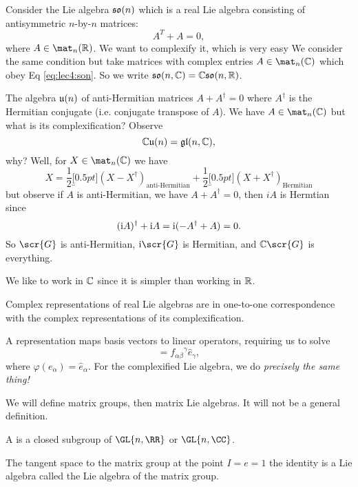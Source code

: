 \begin{ex}
Consider the Lie algebra $\frak{so}(n)$ which is a real Lie
algebra consisting of antisymmetric $n$-by-$n$ matrices:
\begin{equation}\label{eq:lec4:son}
A^{T}+A=0,
\end{equation}
where $A\in\mat_{n}(\Bbb{R})$. We want to complexify it, which is
very easy We consider the same condition but take matrices with
complex entries $A\in\mat_{n}(\Bbb{C})$ which obey Eq \eqref{eq:lec4:son}.
So we write $\frak{so}(n,\Bbb{C})=\Bbb{C}\frak{so}(n,\Bbb{R})$.
\end{ex}
\begin{ex}
The algebra $\frak{u}(n)$ of anti-Hermitian matrices $A+A^{\dagger}=0$
where $A^{\dagger}$ is the Hermitian conjugate (i.e. conjugate
transpose of $A$). We have $A\in\mat_{n}(\Bbb{C})$ but what is
its complexification? Observe
\begin{equation}
\Bbb{C}\frak{u}(n)=\frak{gl}(n,\Bbb{C}),
\end{equation}
why? Well, for $X\in\mat_{n}(\Bbb{C})$ we have
\begin{equation}
X = \frac{1}{2}\underbracket[0.5pt]{(X-X^{\dagger})}_{\text{anti-Hermitian}}+\frac{1}{2}\underbracket[0.5pt]{(X+X^{\dagger})}_{\text{Hermitian}}
\end{equation}
but observe if $A$ is anti-Hermitian, we have $A+A^{\dagger}=0$,
then $iA$ is Hermtian since
\begin{equation}
(\mathrm{i} A)^{\dagger}+\mathrm{i} A=\mathrm{i} (-A^{\dagger}+A)=0.
\end{equation}
So $\scr{G}$ is anti-Hermitian, $\I \scr{G}$ is Hermitian, and
$\Bbb{C}\scr{G}$ is everything.
\end{ex}

We like to work in $\Bbb{C}$ since it is simpler than working in $\Bbb{R}$.

\begin{thm}
Complex representations of real Lie algebras are in one-to-one
correspondence with the complex representations of its complexification.
\end{thm}
A representation maps basis vectors to linear operators,
requiring us to solve
\begin{equation}
[\widehat{e}_{\alpha},\widehat{e}_{\beta}]={f_{\alpha\beta}}^{\gamma}\widehat{e}_{\gamma},
\end{equation}
where $\varphi(e_{\alpha})=\widehat{e}_{\alpha}$. For the
complexified Lie algebra, we do \emph{precisely the same thing!}

We will define matrix groups, then matrix Lie algebras. It will
not be a general definition.
\begin{defn}
A  is a closed subgroup of $\GL{n,\RR}$
or $\GL{n,\CC}$.
\end{defn}
\begin{thm}
The tangent space to the matrix group at the point $I=e=1$ the
identity is a Lie algebra called the Lie algebra of the matrix group.
\end{thm}

